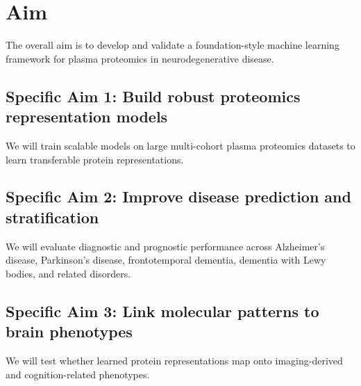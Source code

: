 \section{Aim}

The overall aim is to develop and validate a foundation-style machine
learning framework for plasma proteomics in neurodegenerative disease.

\subsection{Specific Aim 1: Build robust proteomics representation models}

We will train scalable models on large multi-cohort plasma proteomics
datasets to learn transferable protein representations.

\subsection{Specific Aim 2: Improve disease prediction and stratification}

We will evaluate diagnostic and prognostic performance across
Alzheimer’s disease, Parkinson’s disease, frontotemporal dementia,
dementia with Lewy bodies, and related disorders.

\subsection{Specific Aim 3: Link molecular patterns to brain phenotypes}

We will test whether learned protein representations map onto
imaging-derived and cognition-related phenotypes.
